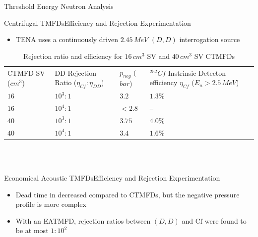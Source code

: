 \documentclass{puposter}
\begin{document}
\begin{pucol}{7}{12}
\begin{pucell}{7}{6}{Threshold Energy Neutron Analysis}{}
\begin{pucell}{3}{3}{Centrifugal TMFDs}{Efficiency and Rejection Experimentation}
    \begin{itemize}
      \item TENA uses a continuously driven $2.45\,MeV$ $\left(D,D\right)$ interrogation source
    \end{itemize}
    \begin{table}[H]
        \vspace*{-0.5cm}
        \caption{Rejection ratio and efficiency for $16\,cm^{3}$ SV and $40\,cm^{3}$ SV CTMFDs}
        \def\arraystretch{1.0}
        \hspace*{0.5cm}
        \begin{tabular}{>{\centering}m{}>{\centering}m{}>{\centering}m{}>{\centering}m{}}
            \rowcolor{newgold}
            CTMFD SV ($cm^{3}$) & DD Rejection Ratio ($\eta_{Cf}:\eta_{DD}$) & $p_{neg}$ ($bar$) & $^{252}Cf$ Instrinsic Detecton efficiency $\eta_{Cf}$ ($E_{n}>2.5\,MeV$)\tabularnewline
            $16$ & $10^{3}:1$ & $3.2$ & $1.3\%$\tabularnewline
            $16$ & $10^{4}:1$ & $<2.8$ & --\tabularnewline
            $40$ & $10^{3}:1$ & $3.75$ & $4.0\%$\tabularnewline
            $40$ & $10^{4}:1$ & $3.4$ & $1.6\%$\tabularnewline
        \end{tabular}
    \end{table}
  \end{pucell}%
  \hspace*{\fill}
  \begin{pucell}{2}{3}{}{}
  \end{pucell}%
  \hspace*{\fill}
  \begin{pucell}{2}{3}{}{}
  \end{pucell} \\
  \vspace*{0.25in} \\
  \begin{pucell}{3}{3}{Economical Acoustic TMFDs}{Efficiency and Rejection Experimentation}
    \begin{itemize}
      \item Dead time in decreased compared to CTMFDs, but the negative pressure profile is more complex
      \item With an EATMFD, rejection ratios between $\left(D,D\right)$ and $\mathrm{Cf}$ were found to be at most $1:10^{2}$

\end{itemize}
\end{pucell}
\end{pucell}
\end{pucol}
\end{document}
